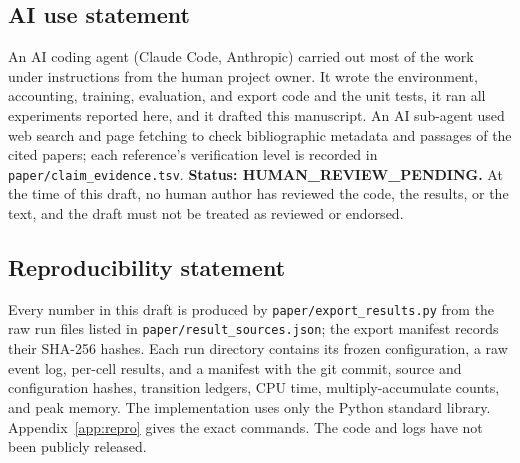 \subsection*{AI use statement}
An AI coding agent (Claude Code, Anthropic) carried out most of the work under instructions from the human project owner. It wrote the environment, accounting, training, evaluation, and export code and the unit tests, it ran all experiments reported here, and it drafted this manuscript. An AI sub-agent used web search and page fetching to check bibliographic metadata and passages of the cited papers; each reference's verification level is recorded in \texttt{paper/claim\_evidence.tsv}. \textbf{Status: HUMAN\_REVIEW\_PENDING.} At the time of this draft, no human author has reviewed the code, the results, or the text, and the draft must not be treated as reviewed or endorsed.

\subsection*{Reproducibility statement}
Every number in this draft is produced by \texttt{paper/export\_results.py} from the raw run files listed in \texttt{paper/result\_sources.json}; the export manifest records their SHA-256 hashes. Each run directory contains its frozen configuration, a raw event log, per-cell results, and a manifest with the git commit, source and configuration hashes, transition ledgers, CPU time, multiply-accumulate counts, and peak memory. The implementation uses only the Python standard library. Appendix~\ref{app:repro} gives the exact commands. The code and logs have not been publicly released.
